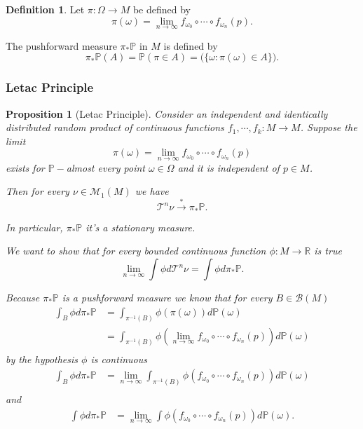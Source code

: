 \documentclass[a4paper]{article}
\theoremstyle{plain}
\newtheorem{prop} [theorem]{Proposition}
\theoremstyle{definition}
\newtheorem{defn}[theorem]{Definition}%
\begin{document}
    \begin{defn}
        Let $\pi:\Omega \to M$ be defined by 
        $$ \pi(\omega) = \lim_{n \to \infty} f_{\omega_0} \circ \cdots \circ f_{\omega_n}(p).$$

        The pushforward measure $\pi_*\mathbb{P} $  in $M$ is defined by 
        $$\pi_*\mathbb{P}(A) = \mathbb{P}(\pi \in A) = \mathbb(\{\omega: \pi(\omega) \in A\}). $$

    \end{defn}

    \subsubsection{Letac Principle}
    \begin{prop}[Letac Principle] 
    Consider an independent and identically distributed random product of continuous functions $f_{1},\cdots, f_{k}:M\rightarrow M$. Suppose the limit 
    $$\pi(\omega) = \lim_{n \to \infty} f_{\omega_0} \circ \cdots \circ f_{\omega_n}(p)$$
    exists for $\mathbb{P}-$almost every point $\omega \in \Omega$ and it is independent of $p \in M$.

    Then for every $\nu \in \mathcal{M}_1(M)$ we have 
    $$ \mathcal{T}^n \nu \overset{*}{\to} \pi_*\mathbb{P}.$$

    In particular, $\pi_*\mathbb{P}$ it's a stationary measure.
    
    \proof We want to show that for every bounded continuous function $\phi:M \to \mathbb{R}$ is true
    $$ \lim_{n \to \infty}\int \phi d\mathcal{T}^n\nu = \int \phi d\pi_*\mathbb{P}.$$

    Because $\pi_*\mathbb{P}$ is a pushforward measure we know that for every $B \in \mathcal{B}(M)$ 
    \begin{align*}
        \int_B \phi d\pi_*\mathbb{P} 
        &= \int_{\pi^{-1}(B)} \phi(\pi(\omega)) d\mathbb{P}(\omega)\\
        &= \int_{\pi^{-1}(B)} \phi(\lim_{n \to \infty} f_{\omega_0} \circ \cdots \circ f_{\omega_n}(p)) d\mathbb{P}(\omega)\\
    \end{align*}
by the hypothesis $\phi$ is continuous 
    \begin{align*}
        \int_B \phi d\pi_*\mathbb{P} 
        &= \lim_{n \to \infty} \int_{\pi^{-1}(B)} \phi( f_{\omega_0} \circ \cdots \circ f_{\omega_n}(p)) d\mathbb{P}(\omega)\\
    \end{align*}
and 
    \begin{align*}
        \int \phi d\pi_*\mathbb{P} 
        &= \lim_{n \to \infty} \int \phi( f_{\omega_0} \circ \cdots \circ f_{\omega_n}(p)) d\mathbb{P}(\omega).
    \end{align*}


\end{prop}
\end{document}

